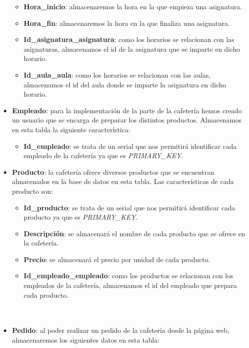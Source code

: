 \documentclass[12pt]{report}
\begin{document}
\begin{itemize}
\begin{itemize}
        \item \textbf{Hora\_inicio}: almacenaremos la hora en la que empieza una asignatura.
        \item \textbf{Hora\_fin}: almacenaremos la hora en la que finaliza una asignatura.
        \item \textbf{Id\_asignatura\_asignatura}: como los horarios se relacionan con las asignaturas, almacenamos el id de la asignatura que se imparte en dicho horario.
        \item \textbf{Id\_aula\_aula}: como los horarios se relacionan con las aulas, almacenamos el id del aula donde se imparte la asignatura en dicho horario.
        \\
    \end{itemize} 
    \item  \textbf{Empleado}: para la implementación de la parte de la cafetería hemos creado un usuario que se encarga de preparar los distintos productos. Almacenamos en esta tabla la siguiente característica:
    \begin{itemize}
        \item\textbf{Id\_empleado}: se trata de un serial que nos permitirá identificar cada empleado de la cafetería ya que es \textit{PRIMARY\_KEY}.
        \\
    \end{itemize} 
    \item  \textbf{Producto}: la cafetería ofrece diversos productos que se encuentran almacenados en la base de datos en esta tabla. Las características de cada producto son:
    \begin{itemize}
        \item\textbf{Id\_producto}: se trata de un serial que nos permitirá identificar cada producto ya que es \textit{PRIMARY\_KEY}.
        \item \textbf{Descripción}: se almacenará el nombre de cada producto que se ofrece en la cafetería.
        \item \textbf{Precio}: se almacenará el precio por unidad de cada producto.
        \item \textbf{Id\_empleado\_empleado}: como los productos se relacionan con los empleados de la cafetería, almacenamos el id del empleado que prepara cada producto.
        \\\\\\
    \end{itemize} 
    \item \textbf{Pedido}: al poder realizar un pedido de la cafetería desde la página web, almacenaremos los siguientes datos en esta tabla:

\end{itemize}
\end{document}
